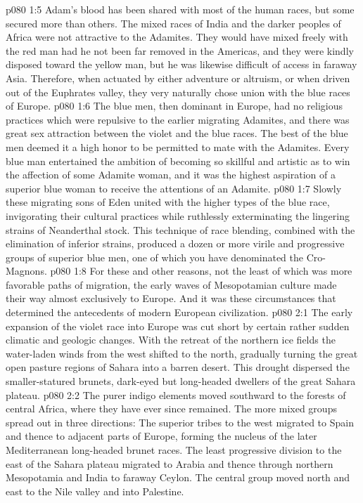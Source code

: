 \vs p080 1:5 Adam’s blood has been shared with most of the human races, but some secured more than others. The mixed races of India and the darker peoples of Africa were not attractive to the Adamites. They would have mixed freely with the red man had he not been far removed in the Americas, and they were kindly disposed toward the yellow man, but he was likewise difficult of access in faraway Asia. Therefore, when actuated by either adventure or altruism, or when driven out of the Euphrates valley, they very naturally chose union with the blue races of Europe.
\vs p080 1:6 The blue men, then dominant in Europe, had no religious practices which were repulsive to the earlier migrating Adamites, and there was great sex attraction between the violet and the blue races. The best of the blue men deemed it a high honor to be permitted to mate with the Adamites. Every blue man entertained the ambition of becoming so skillful and artistic as to win the affection of some Adamite woman, and it was the highest aspiration of a superior blue woman to receive the attentions of an Adamite.\plusone
\vs p080 1:7 Slowly these migrating sons of Eden united with the higher types of the blue race, invigorating their cultural practices while ruthlessly exterminating the lingering strains of Neanderthal stock. This technique of race blending, combined with the elimination of inferior strains, produced a dozen or more virile and progressive groups of superior blue men, one of which you have denominated the Cro\hyp{}Magnons.
\vs p080 1:8 For these and other reasons, not the least of which was more favorable paths of migration, the early waves of Mesopotamian culture made their way almost exclusively to Europe. And it was these circumstances that determined the antecedents of modern European civilization.
\vs p080 2:1 The early expansion of the violet race into Europe was cut short by certain rather sudden climatic and geologic changes. With the retreat of the northern ice fields the water\hyp{}laden winds from the west shifted to the north, gradually turning the great open pasture regions of Sahara into a barren desert. This drought dispersed the smaller\hyp{}statured brunets, dark\hyp{}eyed but long\hyp{}headed dwellers of the great Sahara plateau.
\vs p080 2:2 The purer indigo elements moved southward to the forests of central Africa, where they have ever since remained. The more mixed groups spread out in three directions: The superior tribes to the west migrated to Spain and thence to adjacent parts of Europe, forming the nucleus of the later Mediterranean long\hyp{}headed brunet races. The least progressive division to the east of the Sahara plateau migrated to Arabia and thence through northern Mesopotamia and India to faraway Ceylon. The central group moved north and east to the Nile valley and into Palestine.
